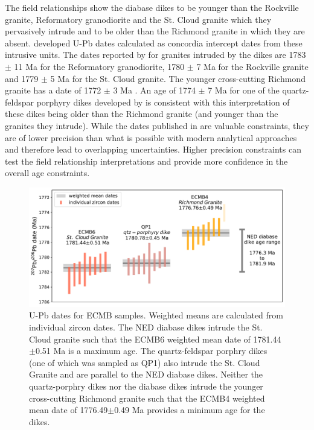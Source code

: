 \documentclass[draft]{agujournal2019}
\begin{document}
The field relationships show the diabase dikes to be younger than the Rockville granite, Reformatory granodiorite and the St. Cloud granite which they pervasively intrude and to be older than the Richmond granite in which they are absent. \cite{Holm2005a} developed U-Pb dates calculated as concordia intercept dates from these intrusive units. The dates reported by \cite{Holm2005a} for granites intruded by the dikes are 1783 $\pm$ 11 Ma for the Reformatory granodiorite, 1780 $\pm$ 7 Ma for the Rockville granite and 1779 $\pm$ 5 Ma for the St. Cloud granite. The younger cross-cutting Richmond granite has a date of 1772 $\pm$ 3 Ma \cite{Holm2005a}. An age of 1774 $\pm$ 7 Ma for one of the quartz-feldspar porphyry dikes developed by \cite{Holm2005a} is consistent with this interpretation of these dikes being older than the Richmond granite (and younger than the granites they intrude). While the dates published in  are valuable constraints, they are of lower precision than what is possible with modern analytical approaches and therefore lead to overlapping uncertainties. Higher precision constraints can test the field relationship interpretations and provide more confidence in the overall age constraints.

\begin{figure}[!ht]
\centering
\noindent\includegraphics[width=\textwidth]{./figures/ECMB_new_U_Pb_dates.pdf}
\caption{\small{U-Pb dates for ECMB samples. Weighted means are calculated from individual zircon dates. The NED diabase dikes intrude the St. Cloud granite such that the ECMB6 weighted mean date of 1781.44$\pm$0.51 Ma is a maximum age. The quartz-feldspar porphry dikes (one of which was sampled as QP1) also intrude the St. Cloud Granite and are parallel to the NED diabase dikes. Neither the quartz-porphry dikes nor the diabase dikes intrude the younger cross-cutting Richmond granite such that the ECMB4 weighted mean date of 1776.49$\pm$0.49 Ma provides a minimum age for the dikes.}}
\label{fig:U_Pb_dates}
\end{figure}
\end{document}
